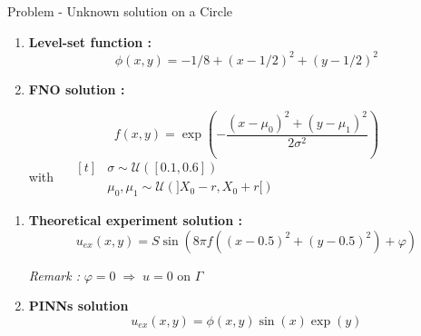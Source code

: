 \begin{frame}{Problem - Unknown solution on a Circle}
    \begin{minipage}{0.3\linewidth}
        \centering
    \end{minipage} \;
    \begin{minipage}{0.68\linewidth}
        \begin{enumerate}[\ding{217}]
            \item \textbf{Level-set function : }
            $$\phi(x,y)=-1/8+(x-1/2)^2+(y-1/2)^2$$

            \item \textbf{FNO solution :} 
    
            \begin{equation}
            	f(x,y) = \exp\left(-\frac{(x-\mu_0)^2 + (y-\mu_1)^2}{2\sigma^2}\right) \label{sol1}
            \end{equation} 
            with $\quad \begin{aligned}[t]
                &\sigma \sim \mathcal{U}([0.1,0.6]) \\
                &\mu_0, \mu_1 \sim \mathcal{U}(]X_0-r, X_0+r[)
            \end{aligned}$
            
            \footnotesize
        \end{enumerate}
    \end{minipage}

    \begin{enumerate}[\ding{217}]
        \item \textbf{Theoretical experiment solution :}
        \begin{equation}
        	u_{ex}(x,y)=S\sin\left(8\pi f\left((x-0.5)^2+(y-0.5)^2\right)+\varphi\right) \label{sol2}
        \end{equation}
        
        \footnotesize
        \textit{Remark :} $\varphi=0 \; \Rightarrow \; u=0 \text{ on } \Gamma$

        \normalsize
        \item \textbf{PINNs solution}
        \begin{equation}
        	u_{ex}(x,y)=\phi(x,y)\sin(x)\exp(y) \label{sol3}
        \end{equation}
    \end{enumerate}
\end{frame}